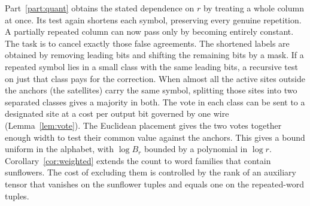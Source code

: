Part~\ref{part:quant} obtains the stated dependence on \(r\) by treating
a whole column at once. Its test again shortens each symbol, preserving
every genuine repetition. A partially repeated column can now pass
only by becoming entirely constant. The task is to cancel exactly
those false agreements. The shortened labels are obtained by removing leading bits and
shifting the remaining bits by a mask. If a repeated symbol lies in a
small class with the same leading bits, a recursive test on just that
class pays for the correction. When almost all the active sites outside
the anchors (the satellites) carry the same symbol, splitting those sites into two separated
classes gives a majority in both. The vote in each class can be sent
to a designated site at a cost per output bit governed by one wire
(Lemma~\ref{lem:vote}). The Euclidean placement gives the two votes
together enough width to test their common value against the anchors.
This gives a bound uniform in the alphabet, with \(\log B_r\) bounded
by a polynomial in \(\log r\).
Corollary~\ref{cor:weighted} extends the count to word families that
contain sunflowers. The cost of excluding them is controlled by the rank
of an auxiliary tensor that vanishes on the sunflower tuples and equals
one on the repeated-word tuples.


